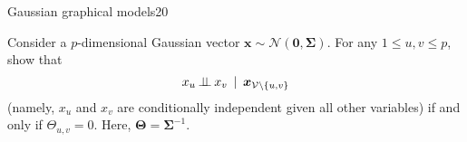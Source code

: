 \documentclass{article}
\begin{document}
\begin{problem}{Gaussian graphical models}{20}

Consider a $p$-dimensional Gaussian vector $\bm{x} \sim \mathcal{N} (\bm{0}, \bm{\Sigma})$. For any $1\leq u,v \leq p$, show that 
  \vspace{-0.5em}
  \[
    x_{u} \hspace{0.2em} {\perp\!\!\!\perp} \hspace{0.2em}x_{v} \hspace{0.2em} \mid \hspace{0.2em} \bm{x}_{\mathcal{V}\backslash\{u,v\}}
  \] 
(namely, $x_{u}$ and $x_{v}$ are conditionally independent given all other variables) if and only if ${\Theta}_{u,v} = 0$. Here, $\bm{\Theta}= \bm{\Sigma}^{-1}$. 


\solution{

}
\end{problem}
\end{document}

